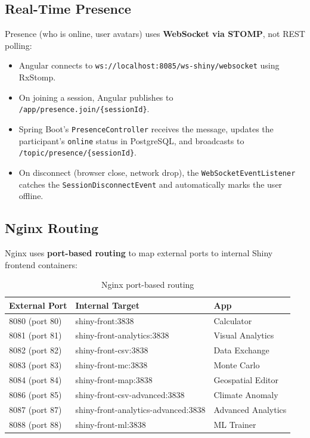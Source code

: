 \documentclass[12pt,a4paper]{article}
\begin{document}
\subsection{Real-Time Presence}

Presence (who is online, user avatars) uses \textbf{WebSocket via STOMP}, not REST polling:

\begin{itemize}[nosep]
  \item Angular connects to \texttt{ws://localhost:8085/ws-shiny/websocket} using RxStomp.
  \item On joining a session, Angular publishes to \texttt{/app/presence.join/\{sessionId\}}.
  \item Spring Boot's \texttt{PresenceController} receives the message, updates the participant's \texttt{online} status in PostgreSQL, and broadcasts to \texttt{/topic/presence/\{sessionId\}}.
  \item On disconnect (browser close, network drop), the \texttt{WebSocketEventListener} catches the \texttt{SessionDisconnectEvent} and automatically marks the user offline.
\end{itemize}

\subsection{Nginx Routing}

Nginx uses \textbf{port-based routing} to map external ports to internal Shiny frontend containers:

\begin{table}[h]
\centering
\small
\begin{tabular}{@{}lll@{}}
\toprule
\textbf{External Port} & \textbf{Internal Target} & \textbf{App} \\
\midrule
8080 (port 80) & shiny-front:3838 & Calculator \\
8081 (port 81) & shiny-front-analytics:3838 & Visual Analytics \\
8082 (port 82) & shiny-front-csv:3838 & Data Exchange \\
8083 (port 83) & shiny-front-mc:3838 & Monte Carlo \\
8084 (port 84) & shiny-front-map:3838 & Geospatial Editor \\
8086 (port 85) & shiny-front-csv-advanced:3838 & Climate Anomaly \\
8087 (port 87) & shiny-front-analytics-advanced:3838 & Advanced Analytics \\
8088 (port 88) & shiny-front-ml:3838 & ML Trainer \\
\bottomrule
\end{tabular}
\caption{Nginx port-based routing}
\end{table}
\end{document}
